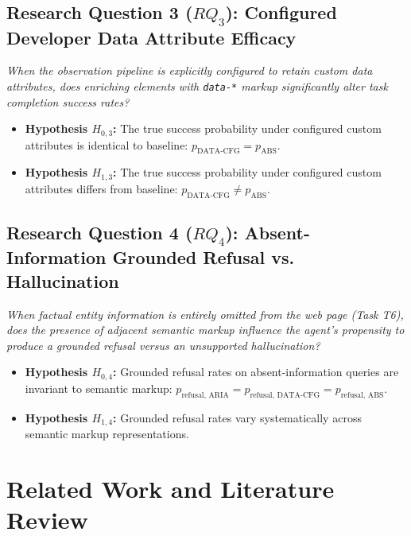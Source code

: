 \documentclass[11pt,a4paper]{article}
\begin{document}
\subsection{Research Question 3 ($RQ_3$): Configured Developer Data Attribute Efficacy}
\textit{When the observation pipeline is explicitly configured to retain custom data attributes, does enriching elements with \texttt{data-*} markup significantly alter task completion success rates?}
\begin{itemize}
    \item \textbf{Hypothesis $H_{0,3}$:} The true success probability under configured custom attributes is identical to baseline: $p_{\text{DATA-CFG}} = p_{\text{ABS}}$.
    \item \textbf{Hypothesis $H_{1,3}$:} The true success probability under configured custom attributes differs from baseline: $p_{\text{DATA-CFG}} \neq p_{\text{ABS}}$.
\end{itemize}

\subsection{Research Question 4 ($RQ_4$): Absent-Information Grounded Refusal vs. Hallucination}
\textit{When factual entity information is entirely omitted from the web page (Task T6), does the presence of adjacent semantic markup influence the agent's propensity to produce a grounded refusal versus an unsupported hallucination?}
\begin{itemize}
    \item \textbf{Hypothesis $H_{0,4}$:} Grounded refusal rates on absent-information queries are invariant to semantic markup: $p_{\text{refusal, ARIA}} = p_{\text{refusal, DATA-CFG}} = p_{\text{refusal, ABS}}$.
    \item \textbf{Hypothesis $H_{1,4}$:} Grounded refusal rates vary systematically across semantic markup representations.
\end{itemize}

\section{Related Work and Literature Review}
\label{sec:related}
\end{document}
